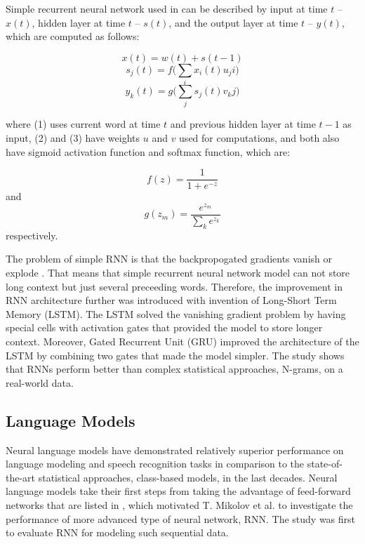 \documentclass{IEEEtran}
\begin{document}
Simple recurrent neural network used in \cite{Mikolov2010NeuralLM} can be described by input at time \(t\) -- \(x(t)\), hidden layer at time \(t\) -- \(s(t)\), and the output layer at time \(t\) -- \(y(t)\), which are computed as follows:

\begin{equation}
	x(t) = w(t) + s(t-1)
\end{equation}
\begin{equation}
	s_j(t) = f\Bigg(\sum_i{x_i(t)u_ji}\Bigg)
\end{equation}
\begin{equation}
	y_k(t) = g\Bigg(\sum_j{s_j(t) v_kj}\Bigg)
\end{equation}

where (1) uses current word at time \(t\) and previous hidden layer at time \(t-1\) as input, (2) and (3) have weights \(u\) and \(v\) used for computations, and both also have sigmoid activation function and softmax function, which are:

\begin{equation}
	f(z) = \frac{1}{1+e^{-z}}
\end{equation}
and
\begin{equation}
	g(z_m) = \frac{e^{z_m}}{\sum_k{e^{z_k}}}
\end{equation}
respectively.

The problem of simple RNN is that the backpropogated gradients vanish or explode \cite{rnn}. That means that simple recurrent neural network model can not store long context but just several preceeding words. Therefore, the improvement in RNN architecture further was introduced with invention of Long-Short Term Memory (LSTM). The LSTM solved the vanishing gradient problem by having special cells with activation gates that provided the model to store longer context. Moreover, Gated Recurrent Unit (GRU) improved the architecture of the LSTM by combining two gates that made the model simpler. The study \cite{rnn} shows that RNNs perform better than complex statistical approaches, N-grams, on a real-world data.

\subsection{Language Models}

Neural language models have demonstrated relatively superior performance on language modeling and speech recognition tasks in comparison to the state-of-the-art statistical approaches, class-based models, in the last decades. Neural language models take their first steps from taking the advantage of feed-forward networks that are listed in \cite{Mikolov2010NeuralLM}, which motivated T. Mikolov et al. to investigate the performance of more advanced type of neural network, RNN. The study was first to evaluate RNN for modeling such sequential data.
\end{document}
